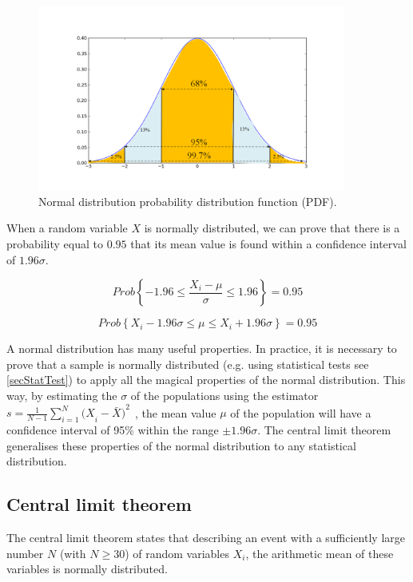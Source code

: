 \begin{figure}[hbt!]
\centering
\includegraphics[width=0.9\textwidth]{SectionLetsMath/elemStat_figures/fig_normal.png}
\captionsetup{type=figure}
\caption{Normal distribution probability distribution function (PDF).}
\label{fig_normal}
\end{figure}

When a random variable $X$ is normally distributed, we can prove that there is a  probability equal to $0.95$ that its mean value is found within a confidence interval of $1.96\sigma$.

\begin{equation}
Prob\left\{-1.96\le\frac{X_i-\mu}{\sigma}\le1.96\right\}=0.95
\label{eq_pdfConfidenceInterval1}
\end{equation}

\begin{equation}
Prob\left\{X_i-1.96\sigma\le\mu\le X_i+1.96\sigma\right\}=0.95
\label{eq_pdfConfidenceInterval2}
\end{equation}

A normal distribution has many useful properties. In practice, it is necessary to prove that a sample is normally distributed (e.g. using statistical tests see \ref{secStatTest}) to apply all the magical properties of the normal distribution. This way, by estimating the $\sigma$ of the populations using the estimator $s=\frac{1}{N-1}\sum_{i=1}^{N}{{{(X}_i-\bar{X})}^2\ \ }$, the mean value $\mu$ of the population will have a confidence interval of 95\% within the range $\pm1.96\sigma$. The central limit theorem generalises these properties of the normal distribution to any statistical distribution.

\subsection{Central limit theorem}
The central limit theorem states that describing an event with a sufficiently large number $N$ (with $N\geq30$) of random variables $X_i$, the arithmetic mean of these variables is normally distributed.

